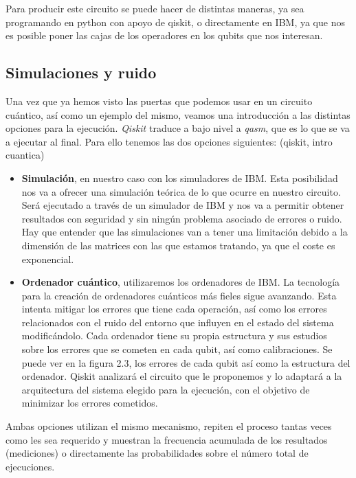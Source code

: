  Para producir este circuito se puede hacer de distintas maneras, ya sea programando en python con apoyo de qiskit, o directamente en IBM, ya que nos es posible poner las cajas de los operadores en los qubits que nos interesan.
 
\subsection{Simulaciones y ruido} 
 Una vez que ya hemos visto las puertas que podemos usar en un circuito cuántico, así como un ejemplo del mismo, veamos una introducción a las distintas opciones para la ejecución. \textit{Qiskit} traduce a bajo nivel a \textit{qasm}, que es lo que se va a ejecutar al final. Para ello tenemos las dos opciones siguientes: (qiskit, intro cuantica)
 
 \begin{itemize}
     \item \textbf{Simulación}, en nuestro caso con los simuladores de IBM. Esta posibilidad nos va a ofrecer una simulación teórica de lo que ocurre en nuestro circuito. Será ejecutado a través de un simulador de IBM y nos va a permitir obtener resultados con seguridad y sin ningún problema asociado de errores o ruido. Hay que entender que las simulaciones van a tener una limitación debido a la dimensión de las matrices con las que estamos tratando, ya que el coste es exponencial.
     \item \textbf{Ordenador cuántico}, utilizaremos los ordenadores de IBM. La tecnología para la creación de ordenadores cuánticos más fieles sigue avanzando. Esta intenta mitigar los errores que tiene cada operación, así como los errores relacionados con el ruido del entorno que influyen en el estado del sistema modificándolo. Cada ordenador tiene su propia estructura y sus estudios sobre los errores que se cometen en cada qubit, así como calibraciones. Se puede ver en la figura 2.3, los errores de cada qubit así como la estructura del ordenador. Qiskit analizará el circuito que le proponemos y lo adaptará a la arquitectura del sistema elegido para la ejecución, con el objetivo de minimizar los errores cometidos.
 \end{itemize}

 Ambas opciones utilizan el mismo mecanismo, repiten el proceso tantas veces como les sea requerido y muestran la frecuencia acumulada de los resultados (mediciones) o directamente las probabilidades sobre el número total de ejecuciones.

